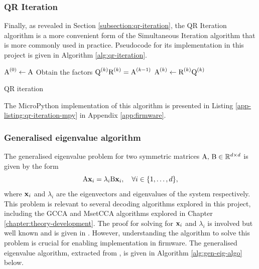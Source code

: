 \subsubsection{QR Iteration}
Finally, as revealed in Section \ref{subsection:qr-iteration}, the QR Iteration algorithm is a more convenient form of the Simultaneous Iteration algorithm that is more commonly used in practice. Pseudocode for its implementation in this project is given in Algorithm \ref{alg:qr-iteration}.
\begin{algorithm}
\begin{algorithmic}
\State ${\textrm{A}}^{(0)} \gets {\textrm{A}}$
    \State Obtain the factors ${\textrm{Q}}^{(k)}{\textrm{R}}^{(k)} = {\textrm{A}}^{(k-1)}$ 
    \State ${\textrm{A}}^{(k)} \gets {\textrm{R}}^{(k)}{\textrm{Q}}^{(k)}$ 
\EndFor
\end{algorithmic}
\caption{QR iteration}
\label{alg:qr-iteration}
\end{algorithm}
The MicroPython implementation of this algorithm is presented in Listing \ref{app-listing:qr-iteration-mpy} in Appendix \ref{app:firmware}.

\subsubsection{Generalised eigenvalue algorithm}
The generalised eigenvalue problem for two symmetric matrices ${\textrm{A}}, \, {\textrm{B}} \in \mathbb{R}^{d \times d}$ is given by the form
\begin{equation}
    {\textrm{A}}{\mathbf{x}}_{i}=\lambda_{i} {\textrm{B}} {\mathbf{x}}_{i}, \quad \forall i \in\{1, \ldots, d\},
    \label{eq:gen-eig-problem}
\end{equation}
where ${\mathbf{x}}_i$ and $\lambda_i$ are the eigenvectors and eigenvalues of the system respectively. This problem is relevant to several decoding algorithms explored in this project, including the GCCA and MsetCCA algorithms explored in Chapter \ref{chapter:theory-development}. The proof for solving for ${\mathbf{x}}_i$ and $\lambda_i$ is involved but well known and is given in \cite{ghojogh-gen-eig-prob}. However, understanding the algorithm to solve this problem is crucial for enabling implementation in firmware. The generalised eigenvalue algorithm, extracted from \cite{ghojogh-gen-eig-prob}, is given in Algorithm \ref{alg:gen-eig-algo} below.

